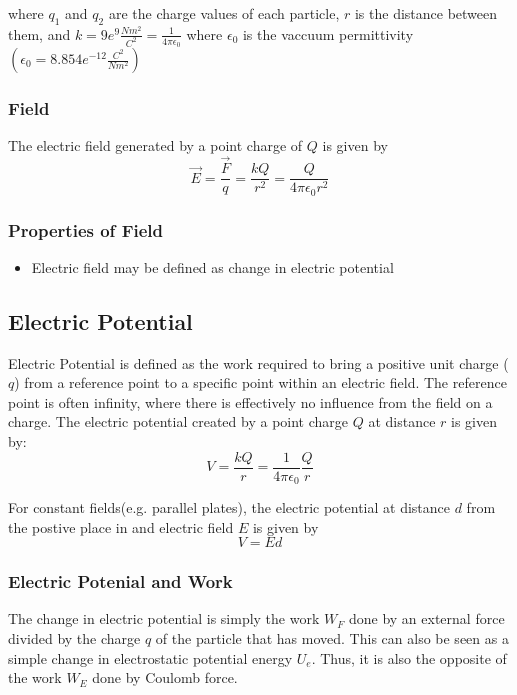 \documentclass[a4paper,12pt]{article}
\begin{document}
								where $q_{1}$ and $q_{2}$ are the charge values of each particle, $r$ is the distance between them, and $k = 9e^{9} \frac{Nm^{2}}{C^{2}} = \frac{1}{4\pi\epsilon_{0}}$ where $\epsilon_{0}$ is the vaccuum permittivity$\left(\epsilon_{0} = 8.854e^{-12}\frac{C^{2}}{Nm^{2}}\right)$

						\subsubsection{Field}
								The electric field generated by a point charge of $Q$ is given by
								\begin{equation*}
										\vec{E} = \frac{\vec{F}}{q} = \frac{kQ}{r^{2}}= \frac{Q}{4\pi\epsilon_{0}r^{2}}
								\end{equation*}

						\subsubsection{Properties of Field}
								\begin{itemize}
										\item Electric field may be defined as change in electric potential 
								\end{itemize}
				\subsection{Electric Potential}
						Electric Potential is defined as the work required to bring a positive unit charge ($q$) from a reference point to a specific point within an electric field. The reference point is often infinity, where there is effectively no influence from the field on a charge. The electric potential created by a point charge $Q$ at distance $r$ is given by:
						\begin{equation*}
								V = \frac{kQ}{r} = \frac{1}{4\pi\epsilon_{0}}\frac{Q}{r}
						\end{equation*}

						For constant fields(e.g. parallel plates), the electric potential at distance $d$ from the postive place in and electric field $E$ is given by
						\begin{equation*}
								V = Ed
						\end{equation*}

						\subsubsection{Electric Potenial and Work}
								The change in electric potential is simply the work $W_{F}$ done by an external force divided by the charge $q$ of the particle that has moved. This can also be seen as a simple change in electrostatic potential energy $U_{e}$.  Thus, it is also the opposite of the work $W_{E}$ done by Coulomb force. 
\end{document}
